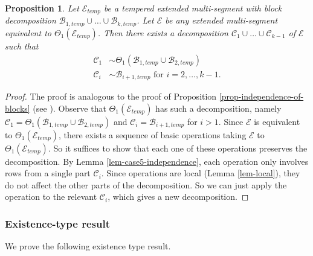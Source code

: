 \documentclass[11pt,letterpaper]{amsart}
\newcommand{\BB}{\mathcal{B}}
\newcommand{\CC}{\mathcal{C}}
\newcommand{\EE}{\mathcal{E}}
\newtheorem{prop}[thm]{Proposition}
\numberwithin{equation}{section}
\begin{document}
\begin{prop}
\label{prop-case5-decomposition}
    Let $\EE_{temp}$ be a tempered extended multi-segment with block decomposition $\BB_{1, temp} \cup \dots \cup \BB_{k, temp}$. Let $\EE$ be any extended multi-segment equivalent to $\Theta_1(\EE_{temp})$. Then there exists a decomposition $\CC_1 \cup \dots \cup \CC_{k-1}$ of $\EE$ such that
    \begin{align*}
        \CC_1 &\sim \Theta_1(\BB_{1, temp} \cup \BB_{2, temp}) \\
        \CC_i &\sim \BB_{i+1, temp} \text{ for } i = 2, \dots, k-1.
    \end{align*}
\end{prop}
\begin{proof}
    The proof is analogous to the proof of Proposition \ref{prop-independence-of-blocks} (see \cite[Lemma 7.12]{HKT26}). Observe that $\Theta_1(\EE_{temp})$ has such a decomposition, namely $\CC_1 = \Theta_1(\BB_{1, temp} \cup \BB_{2, temp})$ and $\CC_i = \BB_{i+1, temp}$ for $i > 1$. Since $\EE$ is equivalent to $\Theta_1(\EE_{temp})$, there exists a sequence of basic operations taking $\EE$ to $\Theta_1(\EE_{temp})$. So it suffices to show that each one of these operations preserves the decomposition. By Lemma \ref{lem-case5-independence}, each operation only involves rows from a single part $\CC_i$. Since operations are local (Lemma \ref{lem-local}), they do not affect the other parts of the decomposition. So we can just apply the operation to the relevant $\CC_i$, which gives a new decomposition.
\end{proof}

\subsubsection{Existence-type result}

We prove the following existence type result.
\end{document}
